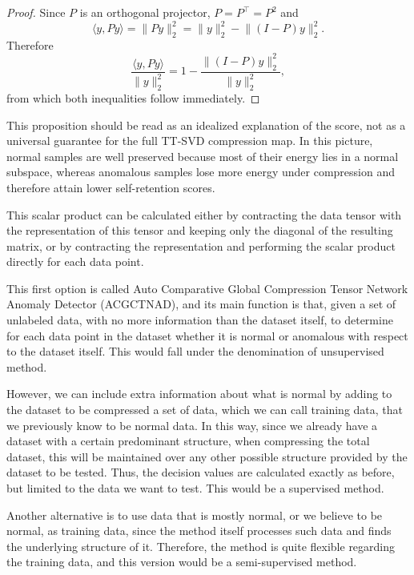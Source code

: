 \documentclass{article}
\begin{document}
\begin{proof}
Since $P$ is an orthogonal projector, $P=P^\top=P^2$ and
\[
    \langle y,Py\rangle=\lVert Py\rVert_2^2=\lVert y\rVert_2^2-\lVert (I-P)y\rVert_2^2.
\]
Therefore
\[
    \frac{\langle y,Py\rangle}{\lVert y\rVert_2^2}
    =1-\frac{\lVert (I-P)y\rVert_2^2}{\lVert y\rVert_2^2},
\]
from which both inequalities follow immediately.
\end{proof}

This proposition should be read as an idealized explanation of the score, not as a universal guarantee for the full TT-SVD compression map. In this picture, normal samples are well preserved because most of their energy lies in a normal subspace, whereas anomalous samples lose more energy under compression and therefore attain lower self-retention scores.

This scalar product can be calculated either by contracting the data tensor with the representation of this tensor and keeping only the diagonal of the resulting matrix, or by contracting the representation and performing the scalar product directly for each data point.

This first option is called Auto Comparative Global Compression Tensor Network Anomaly Detector (ACGCTNAD), and its main function is that, given a set of unlabeled data, with no more information than the dataset itself, to determine for each data point in the dataset whether it is normal or anomalous with respect to the dataset itself. This would fall under the denomination of unsupervised method.

However, we can include extra information about what is normal by adding to the dataset to be compressed a set of data, which we can call training data, that we previously know to be normal data. In this way, since we already have a dataset with a certain predominant structure, when compressing the total dataset, this will be maintained over any other possible structure provided by the dataset to be tested. Thus, the decision values are calculated exactly as before, but limited to the data we want to test. This would be a supervised method.

Another alternative is to use data that is mostly normal, or we believe to be normal, as training data, since the method itself processes such data and finds the underlying structure of it. Therefore, the method is quite flexible regarding the training data, and this version would be a semi-supervised method.
\end{document}
